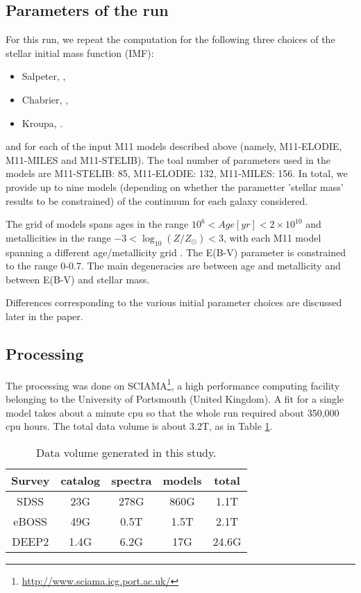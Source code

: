 \documentclass[onecolumn]{aa}
\begin{document}
\subsection{Parameters of the run}
\label{subsec:parameters}

For this run, we repeat the computation for the following three choices of the stellar initial mass function (IMF):
\begin{itemize}
\item Salpeter, \citet{Salpeter_1955},  
\item Chabrier, \citet{Chabrier2003}, 
\item Kroupa, \citet{Kroupa2001}. 
\end{itemize}
and for each of the input M11 models described above (namely, M11-ELODIE, M11-MILES and M11-STELIB).
The toal number of parameters used in the models are M11-STELIB: 85, M11-ELODIE: 132, M11-MILES: 156. 
In total, we provide up to nine models (depending on whether 
the parametter 'stellar mass' results to be constrained) of the continuum for each galaxy considered. 

The grid of models spans ages in the range $10^{6}<Age [yr]< 2 \times 10^{10}$ and metallicities in the range $-3<\log_{10}(Z/Z_\odot)<3$, with each M11 model spanning a different age/metallicity grid \citep[cfr.][Table1]{firefly2017MNRAS}. 
The E(B-V) parameter is constrained to the range 0-0.7. 
The main degeneracies are between age and metallicity and between E(B-V) and stellar mass.

Differences corresponding to the various initial parameter choices are discussed later in the paper.

\subsection{Processing}
The processing was done on  SCIAMA\footnote{\url{http://www.sciama.icg.port.ac.uk/}}, a high performance computing facility belonging to the University of Portsmouth (United Kingdom). 
A fit for a single model takes about a minute cpu so that the whole run required about 350,000 cpu hours. 
The total data volume is about 3.2T, as in Table \ref{table:processing}.
\begin{table}
\caption{\label{table:processing} Data volume generated in this study.}
\begin{center}
\begin{tabular}{ccccc}
\hline \hline
Survey &
catalog &
spectra & 
models & total \\ \hline
SDSS
& 23G
& 278G
& 860G 
& 1.1T \\
eBOSS
& 49G
& 0.5T 
& 1.5T 
& 2.1T \\
DEEP2 
& 1.4G
& 6.2G
& 17G
& 24.6G \\
\hline 
\end{tabular}
\end{center}
\end{table}
\end{document}
